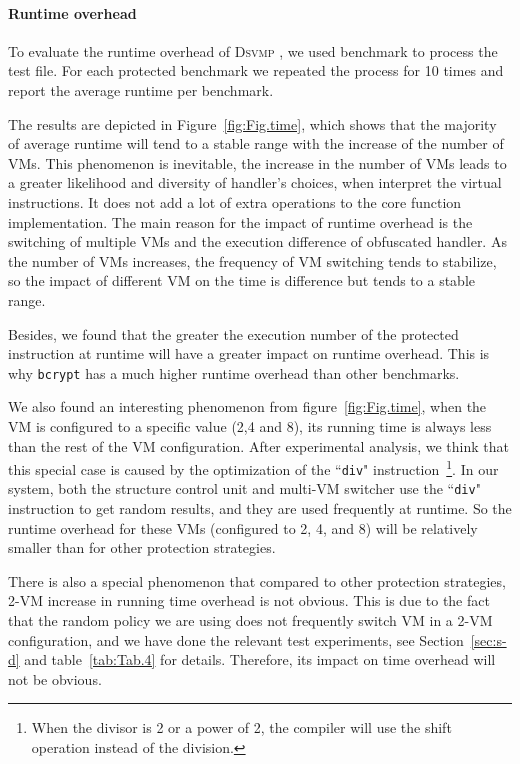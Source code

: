 \documentclass[times]{secauth}
\newcommand{\DSVMP}{\textsc{Dsvmp }}
\begin{document}
\paragraph*{Runtime overhead} To evaluate the runtime overhead of \DSVMP, we used benchmark to process the test file.
For each protected benchmark we repeated the process for 10 times and report the average runtime per benchmark.

The results are depicted in Figure~\ref{fig:Fig.time},
which shows that the majority of average runtime will tend to a stable range with the increase of the number of VMs.
This phenomenon is inevitable, the increase in the number of VMs leads to a
greater likelihood and diversity of handler's choices, when interpret the virtual instructions.
It does not add a lot of extra operations to the core function implementation.
The main reason for the impact of runtime overhead is the switching of multiple VMs
and the execution difference of obfuscated handler.
As the number of VMs increases, the frequency of VM switching tends to stabilize,
so the impact of different VM on the time is difference but tends to a stable range.

Besides, we found that the greater the execution number of the protected instruction at runtime
will have a greater impact on runtime overhead.
This is why \texttt{bcrypt} has a much higher runtime overhead than other benchmarks.

We also found an interesting phenomenon from figure~\ref{fig:Fig.time}, when the VM is configured to a specific value (2,4 and 8),
its running time is always less than the rest of the VM configuration.
After experimental analysis, we think that this special case is caused by the optimization of the ``\texttt{div}" instruction~\footnote{When the divisor is 2 or a power of 2, the compiler will use the shift operation instead of the division.}.
In our system, both the structure control unit and multi-VM switcher use the ``\texttt{div}" instruction to get random results,
and they are used frequently at runtime.
So the runtime overhead for these VMs (configured to 2, 4, and 8) will be relatively smaller than for other protection strategies.

There is also a special phenomenon that compared to other protection strategies,
2-VM increase in running time overhead is not obvious.
This is due to the fact that the random policy we are using does not frequently switch VM in a 2-VM configuration,
and we have done the relevant test experiments, see Section~\ref{sec:s-d} and table~\ref{tab:Tab.4} for details.
Therefore, its impact on time overhead will not be obvious.
\end{document}
